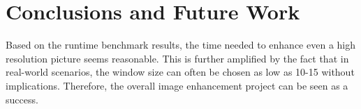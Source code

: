 \documentclass[sigconf]{acmart}
\begin{document}
\begin{table}[htbp]
  \caption{Comparison of the running times and speedup of the image enhancement algorithm based on two pictures and three different window sizes per picture. Measurements were taken on a
laptop running Windows 11 Version 24H2 running on an Intel Core i5-12500H (12 cores, 16 threads) CPU. Speedup is measured as the ratio of the execution time of the serialized version to that of the parallelized version.}
  \label{tab:results2}
\end{table}

\section{Conclusions and Future Work}
Based on the runtime benchmark results, the time needed to enhance even a high resolution picture seems reasonable. This is further amplified by the fact that in real-world scenarios, the window size can often be chosen as low as 10-15 without implications. Therefore, the overall image enhancement project can be seen as a success.
\end{document}
